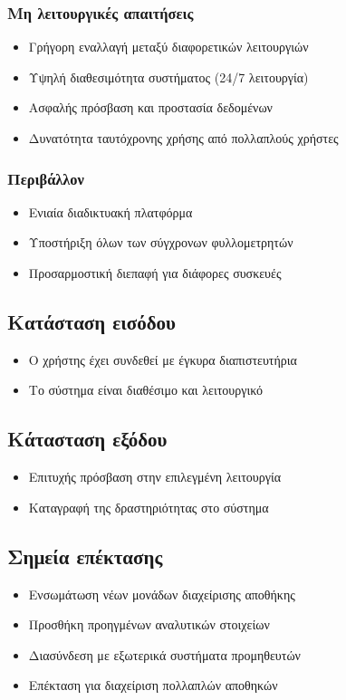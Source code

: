 \documentclass[12pt,a4paper,twoside]{book}
\begin{document}
\subsubsection{Μη λειτουργικές απαιτήσεις}
\begin{itemize}
  \item Γρήγορη εναλλαγή μεταξύ διαφορετικών λειτουργιών %
  \item Υψηλή διαθεσιμότητα συστήματος (24/7 λειτουργία) %
  \item Ασφαλής πρόσβαση και προστασία δεδομένων %
  \item Δυνατότητα ταυτόχρονης χρήσης από πολλαπλούς χρήστες
\end{itemize}

\subsubsection{Περιβάλλον}
\begin{itemize}
  \item Ενιαία διαδικτυακή πλατφόρμα %
  \item Υποστήριξη όλων των σύγχρονων φυλλομετρητών
  \item Προσαρμοστική διεπαφή για διάφορες συσκευές %
\end{itemize}

\subsection{Κατάσταση εισόδου} %
\begin{itemize}
  \item Ο χρήστης έχει συνδεθεί με έγκυρα διαπιστευτήρια %
  \item Το σύστημα είναι διαθέσιμο και λειτουργικό %
\end{itemize}

\subsection{Κάτασταση εξόδου} %
\begin{itemize}
  \item Επιτυχής πρόσβαση στην επιλεγμένη λειτουργία
  \item Καταγραφή της δραστηριότητας στο σύστημα %
\end{itemize}

\subsection{Σημεία επέκτασης}
\begin{itemize}
  \item Ενσωμάτωση νέων μονάδων διαχείρισης αποθήκης %
  \item Προσθήκη προηγμένων αναλυτικών στοιχείων
  \item Διασύνδεση με εξωτερικά συστήματα προμηθευτών %
  \item Επέκταση για διαχείριση πολλαπλών αποθηκών %
\end{itemize}
\end{document}
